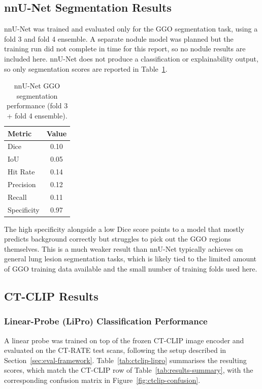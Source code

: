 \subsection{nnU-Net Segmentation Results}

nnU-Net was trained and evaluated only for the GGO segmentation task, using a fold 3 and fold 4
ensemble. A separate nodule model was planned but the training run did not complete in time for
this report, so no nodule results are included here. nnU-Net does not produce a classification or
explainability output, so only segmentation scores are reported in Table~\ref{tab:nnunet-segmentation}.

\begin{table}[H]
\centering
\caption{nnU-Net GGO segmentation performance (fold 3 + fold 4 ensemble).}
\label{tab:nnunet-segmentation}
\begin{tabular}{lc}
\hline
\textbf{Metric} & \textbf{Value} \\
\hline
Dice           & 0.10 \\
IoU            & 0.05 \\
Hit Rate       & 0.14 \\
Precision      & 0.12 \\
Recall         & 0.11 \\
Specificity    & 0.97 \\
\hline
\end{tabular}
\end{table}

The high specificity alongside a low Dice score points to a model that mostly predicts background
correctly but struggles to pick out the GGO regions themselves. This is a much weaker result than
nnU-Net typically achieves on general lung lesion segmentation tasks, which is likely tied to the
limited amount of GGO training data available and the small number of training folds used here.

\subsection{CT-CLIP Results}

\subsubsection{Linear-Probe (LiPro) Classification Performance}

A linear probe was trained on top of the frozen CT-CLIP image encoder and evaluated on the CT-RATE
test scans, following the setup described in Section~\ref{sec:eval-framework}. Table~\ref{tab:ctclip-lipro}
summarises the resulting scores, which match the CT-CLIP row of Table~\ref{tab:results-summary}, with the
corresponding confusion matrix in Figure~\ref{fig:ctclip-confusion}.


